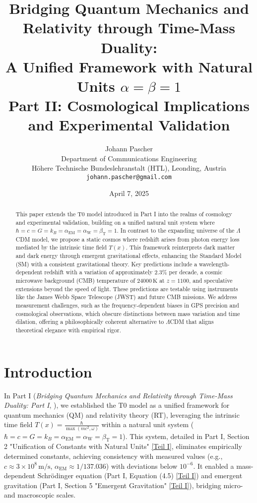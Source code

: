 \documentclass[12pt,a4paper]{article}
\title{Bridging Quantum Mechanics and Relativity through Time-Mass Duality: \\ A Unified Framework with Natural Units \(\alpha = \beta = 1\) \\ Part II: Cosmological Implications and Experimental Validation}
\author{Johann Pascher\\
	Department of Communications Engineering\\
	Höhere Technische Bundeslehranstalt (HTL), Leonding, Austria\\
	\texttt{johann.pascher@gmail.com}}
\date{April 7, 2025}
\newcommand{\Tfield}{T(x)}
\newcommand{\alphaEM}{\alpha_{\text{EM}}}
\newcommand{\alphaW}{\alpha_{\text{W}}}
\newcommand{\betaT}{\beta_{\text{T}}}
\begin{document}
	
	\maketitle
	
	\begin{abstract}
		This paper extends the T0 model introduced in Part I into the realms of cosmology and experimental validation, building on a unified natural unit system where \(\hbar = c = G = k_B = \alphaEM = \alphaW = \betaT = 1\). In contrast to the expanding universe of the \(\Lambda\)CDM model, we propose a static cosmos where redshift arises from photon energy loss mediated by the intrinsic time field \(\Tfield\). This framework reinterprets dark matter and dark energy through emergent gravitational effects, enhancing the Standard Model (SM) with a consistent gravitational theory. Key predictions include a wavelength-dependent redshift with a variation of approximately \(2.3\%\) per decade, a cosmic microwave background (CMB) temperature of \(24000 \, \text{K}\) at \(z = 1100\), and speculative extensions beyond the speed of light. These predictions are testable using instruments like the James Webb Space Telescope (JWST) and future CMB missions. We address measurement challenges, such as the frequency-dependent biases in GPS precision and cosmological observations, which obscure distinctions between mass variation and time dilation, offering a philosophically coherent alternative to \(\Lambda\)CDM that aligns theoretical elegance with empirical rigor.
	\end{abstract}
	
	\section{Introduction}
	\label{sec:introduction}
	
	In Part I (\textit{Bridging Quantum Mechanics and Relativity through Time-Mass Duality: Part I}, \cite{pascher_part1_2025}), we established the T0 model as a unified framework for quantum mechanics (QM) and relativity theory (RT), leveraging the intrinsic time field \(\Tfield = \frac{\hbar}{\max(mc^2, \omega)}\) within a natural unit system (\(\hbar = c = G = k_B = \alphaEM = \alphaW = \betaT = 1\)). This system, detailed in Part I, Section 2 "Unification of Constants with Natural Units" \href{https://github.com/jpascher/T0-Time-Mass-Duality/tree/main/2/pdf/English/QMRelTimeMassPart1En.pdf}{[Teil I]}, eliminates empirically determined constants, achieving consistency with measured values (e.g., \(c \approx 3 \times 10^8 \, \text{m/s}\), \(\alphaEM \approx 1/137.036\)) with deviations below \(10^{-6}\). It enabled a mass-dependent Schrödinger equation (Part I, Equation (4.5) \href{https://github.com/jpascher/T0-Time-Mass-Duality/tree/main/2/pdf/English/QMRelTimeMassPart1En.pdf}{[Teil I]}) and emergent gravitation (Part I, Section 5 "Emergent Gravitation" \href{https://github.com/jpascher/T0-Time-Mass-Duality/tree/main/2/pdf/English/QMRelTimeMassPart1En.pdf}{[Teil I]}), bridging micro- and macroscopic scales.
	
\end{document}

